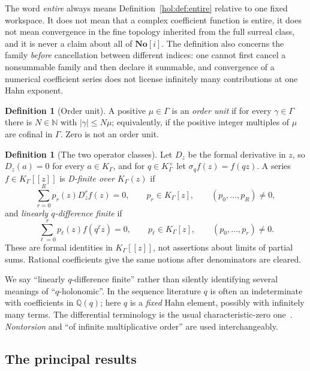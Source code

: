 \documentclass[11pt]{article}
\numberwithin{equation}{section}
\theoremstyle{definition}
\newtheorem{definition}[theorem]{Definition}
\theoremstyle{remark}
\newcommand{\Q}{\mathbb Q}
\newcommand{\N}{\mathbb N}
\newcommand{\No}{\mathbf{No}}
\newcommand{\K}{K_\Gamma}
\newcommand{\abs}[1]{\lvert#1\rvert}
\begin{document}
The word \emph{entire} always means Definition~\ref{hol:def:entire} relative to
one fixed workspace. It does not mean that a complex coefficient function is
entire, it does not mean convergence in the fine topology inherited from the
full surreal class, and it is never a claim about all of $\No[i]$. The
definition also concerns the family \emph{before} cancellation between
different indices: one cannot first cancel a nonsummable family and then
declare it summable, and convergence of a numerical coefficient series does
not license infinitely many contributions at one Hahn exponent.

\begin{definition}[Order unit]\label{hol:def:orderunit}
A positive $\mu\in\Gamma$ is an \emph{order unit} if for every $\gamma\in\Gamma$
there is $N\in\N$ with $\abs\gamma\le N\mu$; equivalently, if the positive
integer multiples of $\mu$ are cofinal in $\Gamma$. Zero is not an order unit.
\end{definition}

\begin{definition}[The two operator classes]\label{hol:def:operators}
Let $D_z$ be the formal derivative in $z$, so $D_z(a)=0$ for every $a\in\K$,
and for $q\in\K^\times$ let $\sigma_qf(z)=f(qz)$. A series $f\in\K[[z]]$ is
\emph{D-finite over $\K(z)$} if
\begin{equation}\label{hol:eq:dlinear}
 \sum_{r=0}^R p_r(z)D_z^rf(z)=0,\qquad p_r\in\K[z],\qquad (p_0,\ldots,p_R)\ne0,
\end{equation}
and \emph{linearly $q$-difference finite} if
\begin{equation}\label{hol:eq:qlinear}
 \sum_{\ell=0}^r p_\ell(z)f(q^\ell z)=0,\qquad p_\ell\in\K[z],
 \qquad (p_0,\ldots,p_r)\ne0.
\end{equation}
These are formal identities in $\K[[z]]$, not assertions about limits of
partial sums. Rational coefficients give the same notions after denominators
are cleared.
\end{definition}

We say ``linearly $q$-difference finite'' rather than silently identifying
several meanings of ``$q$-holonomic''. In the sequence literature $q$ is often
an indeterminate with coefficients in $\Q(q)$; here $q$ is a \emph{fixed} Hahn
element, possibly with infinitely many terms. The differential terminology is
the usual characteristic-zero one~\cite{stanley}. \emph{Nontorsion} and
``of infinite multiplicative order'' are used interchangeably.

\subsection{The principal results}
\end{document}
